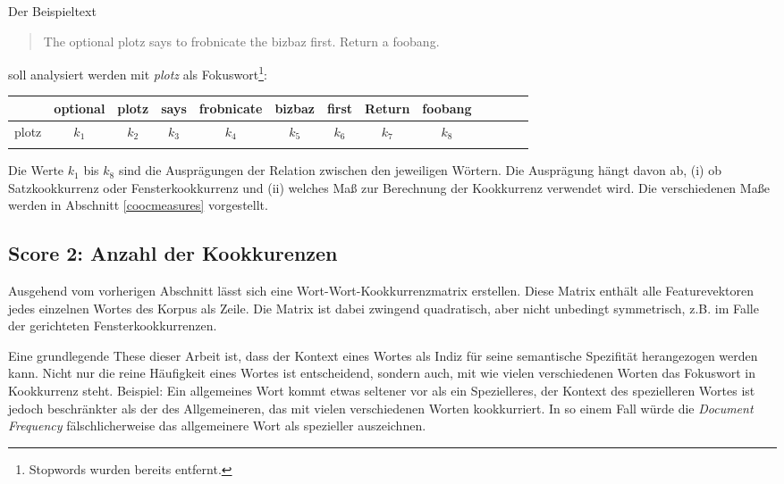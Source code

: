 \documentclass[11pt,numbers=noenddot]{scrartcl}
\begin{document}
\noindent Der Beispieltext
\begin{quote}
    The optional plotz says to frobnicate the bizbaz first. Return a foobang.
\end{quote}
soll analysiert werden mit \emph{plotz} als Fokuswort\footnote{Stopwords wurden bereits entfernt.}:

\begin{table}[h]
    \begin{center}
        \begin{tabular}{ l | *{12}{c}}
                 & optional & plotz & says & frobnicate & bizbaz & first & Return & foobang \\ \hline
            plotz & $k_{1}$ & $k_{2}$ & $k_{3}$ & $k_{4}$ & $k_{5}$ & $k_{6}$ & $k_{7}$ & $k_{8}$ \\ \\
        \end{tabular}
    \end{center}
\end{table}

Die Werte $k_1$ bis $k_8$ sind die Ausprägungen der Relation zwischen den jeweiligen Wörtern. Die Ausprägung hängt davon ab, (i) ob Satzkookkurrenz oder Fensterkookkurrenz und (ii) welches Maß zur Berechnung der Kookkurrenz verwendet wird. Die verschiedenen Maße werden in Abschnitt \ref{coocmeasures} vorgestellt.

\subsection{Score 2: Anzahl der Kookkurenzen} \label{nzds}

Ausgehend vom vorherigen Abschnitt lässt sich eine Wort-Wort-Kookkurrenzmatrix erstellen. Diese Matrix enthält alle Featurevektoren jedes einzelnen Wortes des Korpus als Zeile. Die Matrix ist dabei zwingend quadratisch, aber nicht unbedingt symmetrisch, z.B. im Falle der gerichteten Fensterkookkurrenzen.

Eine grundlegende These dieser Arbeit ist, dass der Kontext eines Wortes als Indiz für seine semantische Spezifität herangezogen werden kann. Nicht nur die reine Häufigkeit eines Wortes ist entscheidend, sondern auch, mit wie vielen verschiedenen Worten das Fokuswort in Kookkurrenz steht. Beispiel: Ein allgemeines Wort kommt etwas seltener vor als ein Spezielleres, der Kontext des spezielleren Wortes ist jedoch beschränkter als der des Allgemeineren, das mit vielen verschiedenen Worten kookkurriert. In so einem Fall würde die \emph{Document Frequency} fälschlicherweise das allgemeinere Wort als spezieller auszeichnen.
\end{document}
